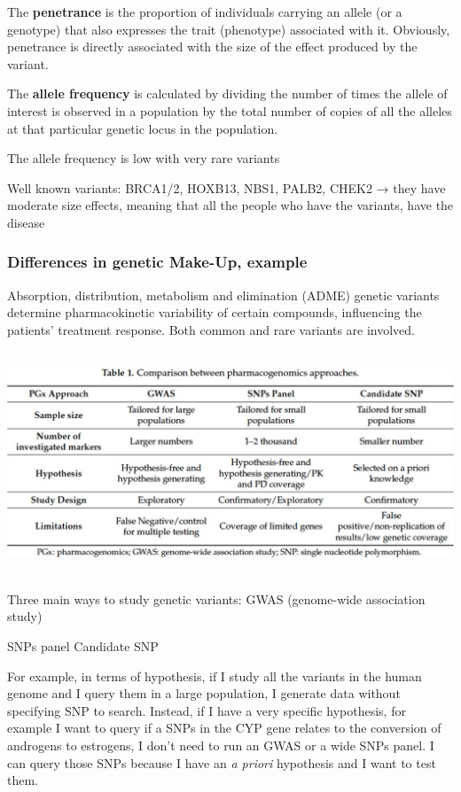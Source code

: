 The \textbf{penetrance} is the proportion of individuals carrying an allele (or
a genotype) that also expresses the trait (phenotype) associated with it.
Obviously, penetrance is directly associated with the size of the effect
produced by the variant.

The \textbf{allele frequency} is calculated by dividing the number of times the
allele of interest is observed in a population by the total number of copies of
all the alleles at that particular genetic locus in the population.

The allele frequency is low with very rare variants

Well known variants: BRCA1/2, HOXB13, NBS1, PALB2, CHEK2 → they have moderate
size effects, meaning that all the people who have the variants, have the
disease


\hypertarget{differences-in-genetic-make-up-example}{%
\subsubsection{Differences in genetic Make-Up,
example}\label{differences-in-genetic-make-up-example}}


Absorption, distribution, metabolism and elimination (ADME) genetic variants
determine pharmacokinetic variability of certain compounds, influencing the
patients' treatment response. Both common and rare variants are involved.

\includegraphics[width=6.18852in,height=2.6224in]{image5.jpeg}

Three main ways to study genetic variants: GWAS (genome-wide association study)

SNPs panel Candidate SNP

For example, in terms of hypothesis, if I study all the variants in the human
genome and I query them in a large population, I generate data without
specifying SNP to search. Instead, if I have a very specific hypothesis, for
example I want to query if a SNPs in the CYP gene relates to the conversion of
androgens to estrogens, I don't need to run an GWAS or a wide SNPs panel. I can
query those SNPs because I have an \emph{a priori} hypothesis and I want to test
them.

